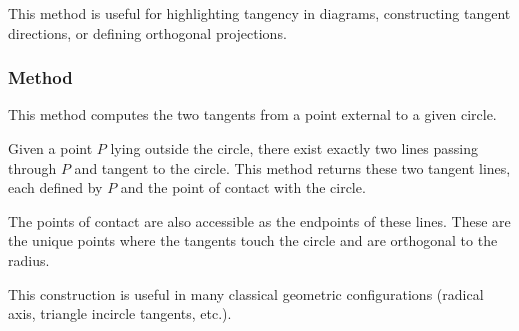 \medskip

This method is useful for highlighting tangency in diagrams, constructing tangent directions, or defining orthogonal projections.

\vspace{1em}


\begin{minipage}{.5\textwidth}
\end{minipage}
\begin{minipage}{.5\textwidth}
\begin{tkzexample}
\end{tkzexample}
\end{minipage}

\subsubsection{Method }
\label{ssub:method_circle_tangent__from_pt}

This method computes the two tangents from a point external to a given circle.

\medskip

Given a point $P$ lying outside the circle, there exist exactly two lines passing through $P$ and tangent to the circle. This method returns these two tangent lines, each defined by $P$ and the point of contact with the circle.

\medskip

The points of contact are also accessible as the endpoints of these lines. These are the unique points where the tangents touch the circle and are orthogonal to the radius.

\medskip

This construction is useful in many classical geometric configurations (radical axis, triangle incircle tangents, etc.).

\vspace{1em}


